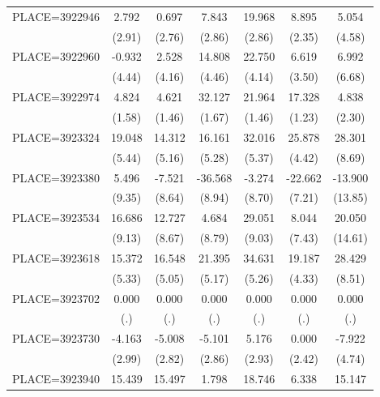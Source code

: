 {\begin{tabular}{l*{6}{c}}
PLACE=3922946       &       2.792&       0.697&       7.843&      19.968&       8.895&       5.054\\
                    &      (2.91)&      (2.76)&      (2.86)&      (2.86)&      (2.35)&      (4.58)\\
PLACE=3922960       &      -0.932&       2.528&      14.808&      22.750&       6.619&       6.992\\
                    &      (4.44)&      (4.16)&      (4.46)&      (4.14)&      (3.50)&      (6.68)\\
PLACE=3922974       &       4.824&       4.621&      32.127&      21.964&      17.328&       4.838\\
                    &      (1.58)&      (1.46)&      (1.67)&      (1.46)&      (1.23)&      (2.30)\\
PLACE=3923324       &      19.048&      14.312&      16.161&      32.016&      25.878&      28.301\\
                    &      (5.44)&      (5.16)&      (5.28)&      (5.37)&      (4.42)&      (8.69)\\
PLACE=3923380       &       5.496&      -7.521&     -36.568&      -3.274&     -22.662&     -13.900\\
                    &      (9.35)&      (8.64)&      (8.94)&      (8.70)&      (7.21)&     (13.85)\\
PLACE=3923534       &      16.686&      12.727&       4.684&      29.051&       8.044&      20.050\\
                    &      (9.13)&      (8.67)&      (8.79)&      (9.03)&      (7.43)&     (14.61)\\
PLACE=3923618       &      15.372&      16.548&      21.395&      34.631&      19.187&      28.429\\
                    &      (5.33)&      (5.05)&      (5.17)&      (5.26)&      (4.33)&      (8.51)\\
PLACE=3923702       &       0.000&       0.000&       0.000&       0.000&       0.000&       0.000\\
                    &         (.)&         (.)&         (.)&         (.)&         (.)&         (.)\\
PLACE=3923730       &      -4.163&      -5.008&      -5.101&       5.176&       0.000&      -7.922\\
                    &      (2.99)&      (2.82)&      (2.86)&      (2.93)&      (2.42)&      (4.74)\\
PLACE=3923940       &      15.439&      15.497&       1.798&      18.746&       6.338&      15.147\\

\end{tabular}}
